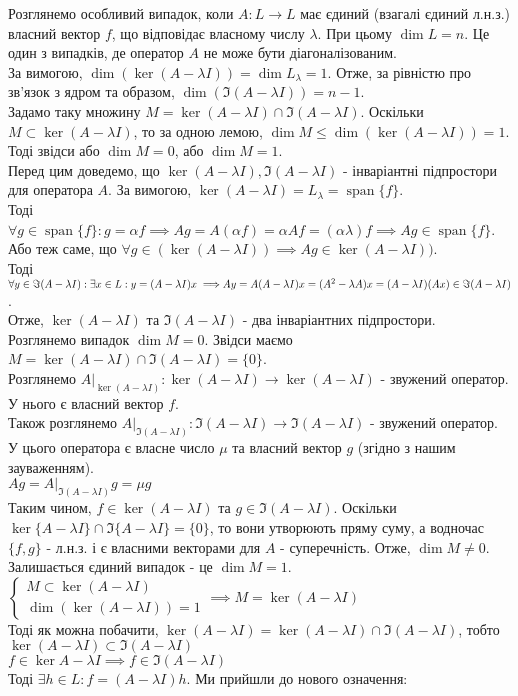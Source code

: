 \documentclass[a4paper, 10pt]{article}
\theoremstyle{theoremdd}
\DeclareMathOperator{\linspan}{span}
\begin{document}
\iffalse
Розглянемо особливий випадок, коли $A: L \to L$ має єдиний (взагалі єдиний л.н.з.) власний вектор $f$, що відповідає власному числу $\lambda$. При цьому $\dim L = n$. Це один з випадків, де оператор $A$ не може бути діагоналізованим.\\
За вимогою, $\dim (\ker(A - \lambda I)) = \dim L_{\lambda} = 1$. Отже, за рівністю про зв'язок з ядром та образом, $\dim (\Im (A - \lambda I)) = n-1$.\\
Задамо таку множину $M=\ker(A-\lambda I) \cap \Im(A-\lambda I)$. Оскільки $M \subset \ker (A-\lambda I)$, то за одною лемою, $\dim M \leq \dim(\ker (A-\lambda I)) = 1$.
Тоді звідси або $\dim M = 0$, або $\dim M = 1$.
\bigskip \\
Перед цим доведемо, що $\ker(A - \lambda I), \Im(A-\lambda I)$ - інваріантні підпростори для оператора $A$. За вимогою, $\ker(A-\lambda I) = L_{\lambda} = \linspan\{f\}$.\\
Тоді $\forall g \in \linspan\{f\}: g = \alpha f \implies Ag = A(\alpha f) = \alpha Af = (\alpha \lambda) f \implies Ag \in \linspan\{f\}$. Або теж саме, що $\forall g \in (\ker(A - \lambda I)) \implies Ag \in  \ker(A - \lambda I))$.
\bigskip \\
Тоді $\forall y \in \Im(A-\lambda I): \exists x \in L: y = (A-\lambda I)x \implies \\ Ay = A(A-\lambda I)x = (A^2-\lambda A)x = (A-\lambda I)(Ax) \in \Im(A-\lambda I)$.\\
Отже, $\ker(A-\lambda I)$ та $\Im(A-\lambda I)$ - два інваріантних підпростори.
\bigskip \\
Розглянемо випадок $\dim M = 0$. Звідси маємо $M = \ker(A-\lambda I) \cap \Im(A-\lambda I) = \{0\}$.\\
Розглянемо $A |_{\ker(A-\lambda I)}: \ker(A-\lambda I) \to \ker(A-\lambda I)$ - звужений оператор. У нього є власний вектор $f$.\\
Також розглянемо $A |_{\Im(A-\lambda I)}: \Im(A-\lambda I) \to \Im(A-\lambda I)$ - звужений оператор. У цього оператора є власне число $\mu$ та власний вектор $g$ (згідно з нашим зауваженням).\\
$Ag = A |_{\Im(A-\lambda I)} g = \mu g$\\
Таким чином, $f \in \ker(A-\lambda I)$ та $g \in \Im(A-\lambda I)$. Оскільки $\ker \{ A-\lambda I \} \cap \Im \{ A - \lambda I \} = \{ 0 \}$, то вони утворюють пряму суму, а водночас $\{f,g\}$ - л.н.з. і є власними векторами для $A$ - суперечність. Отже, $\dim M \neq 0$.
\bigskip \\
Залишається єдиний випадок - це $\dim M = 1$.\\
$\begin{cases}
M \subset \ker(A-\lambda I)\\
\dim{(\ker(A-\lambda I))} = 1
\end{cases}
\implies M = \ker(A-\lambda I)$
\bigskip \\
Тоді як можна побачити, $\ker(A-\lambda I) = \ker(A-\lambda I) \cap \Im (A - \lambda I)$, тобто $\ker(A-\lambda I) \subset \Im(A-\lambda I)$\\
$f \in \ker{A- \lambda I} \implies f \in \Im(A - \lambda I)$\\
Тоді $\exists h \in L: f = (A-\lambda I)h$. Ми прийшли до нового означення:
\end{document}
